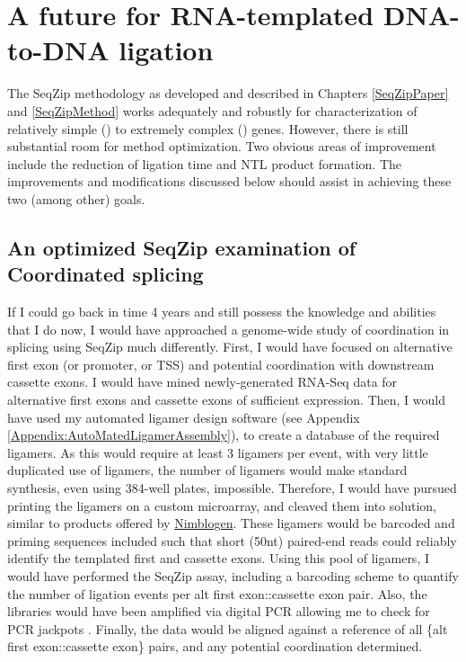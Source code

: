 \section{A future for RNA-templated DNA-to-DNA ligation}
  \label{Disc:sec:SeqZip Improvements}

  The SeqZip methodology as developed and described in Chapters \ref{SeqZipPaper} and \ref{SeqZipMethod} works adequately and robustly for characterization of relatively simple (\cd{}) to extremely complex (\dscam{}) genes. However, there is still substantial room for method optimization. Two obvious areas of improvement include the reduction of ligation time and NTL product formation. The improvements and modifications discussed below should assist in achieving these two (among other) goals.

  \subsection{An optimized SeqZip examination of Coordinated splicing}
    \label{Disc:subsec: Ideal SeqZip exp. to look for Coordination}

    If I could go back in time 4 years and still possess the knowledge and abilities that I do now, I would have approached a genome-wide study of coordination in splicing using SeqZip much differently. First, I would have focused on alternative first exon (or promoter, or TSS) and potential coordination with downstream cassette exons. I would have mined newly-generated RNA-Seq data \citep{Wang2008, Pan2008} for alternative first exons and cassette exons of sufficient expression. Then, I would have used my automated ligamer design software (see Appendix \ref{Appendix:AutoMatedLigamerAssembly}), to create a database of the required ligamers. As this would require at least 3 ligamers per event, with very little duplicated use of ligamers, the number of ligamers would make standard synthesis, even using 384-well plates, impossible. Therefore, I would have pursued printing the ligamers on a custom microarray, and cleaved them into solution, similar to products offered by \href{http://www.nimblegen.com/}{Nimblogen}. These ligamers would be barcoded and priming sequences included such that short (50nt) paired-end reads could reliably identify the templated first and cassette exons. Using this pool of ligamers, I would have performed the SeqZip assay, including a barcoding scheme to quantify the number of ligation events per {alt first exon::cassette exon} pair. Also, the libraries would have been amplified via digital PCR allowing me to check for PCR jackpots \citep{Shiroguchi2012a}. Finally, the data would be aligned against a reference of all \{alt first exon::cassette exon\} pairs, and any potential coordination determined.

